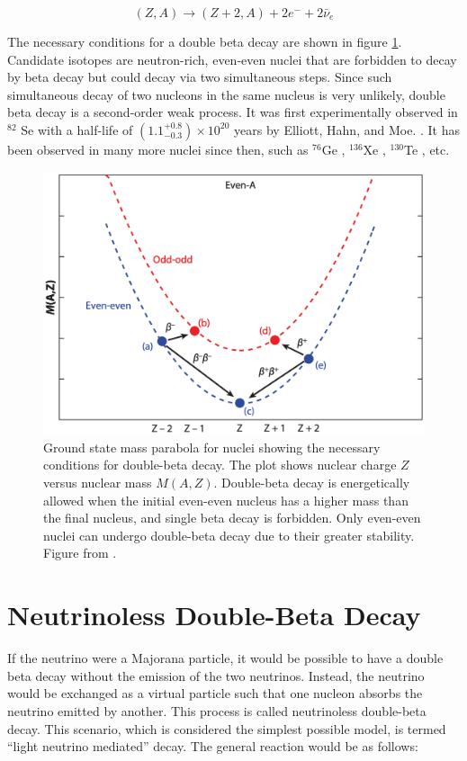 \begin{equation}\label{beta_decay_eq}
(Z,A) \rightarrow (Z+2,A) + 2e^- + 2\bar{\nu}_e
\end{equation}



The necessary conditions for a double beta decay are shown in figure \ref{2nbb_cond}. Candidate isotopes are neutron-rich, even-even nuclei that are forbidden to decay by beta decay but could decay via two simultaneous steps. Since such simultaneous decay of two nucleons in the same nucleus is very unlikely, double beta decay is a second-order weak process. It was first experimentally observed in $^{82}$ Se with a half-life of $(1.1^{+0.8}_{-0.3})\times 10^{20}$ years by Elliott, Hahn, and Moe. \cite{PhysRevLett.59.2020}. It has been observed in many more nuclei since then, such as $^{76}$Ge \cite{PhysRevLett.125.252502}, $^{136}$Xe \cite{PhysRevLett.107.212501}, $^{130}$Te \cite{Alduino2017}, etc.

\clearpage
\begin{figure}[!htb]
\centering
\includegraphics[width=0.85\linewidth]{ch1/figs/2nbb_cond.png}
\caption{Ground state mass parabola for nuclei showing the necessary conditions for double-beta decay. The plot shows nuclear charge \(Z\) versus nuclear mass \(M(A,Z)\). Double-beta decay is energetically allowed when the initial even-even nucleus has a higher mass than the final nucleus, and single beta decay is forbidden. Only even-even nuclei can undergo double-beta decay due to their greater stability. Figure from \cite{2nbb_cond}.}
\label{2nbb_cond}
\end{figure}

\section{Neutrinoless Double-Beta Decay}
If the neutrino were a Majorana particle, it would be possible to have a double beta decay without the emission of the two neutrinos. Instead, the neutrino would be exchanged as a virtual particle such that one nucleon absorbs the neutrino emitted by another. This process is called neutrinoless double-beta decay. This scenario, which is considered the simplest possible model, is termed ``light neutrino mediated'' decay. The general reaction would be as follows:

